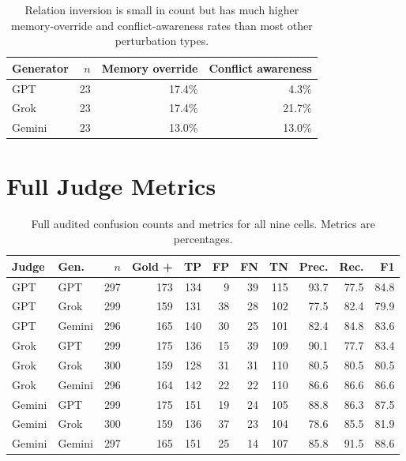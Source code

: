 \documentclass[11pt]{article}
\begin{document}
\begin{table}[h]
\centering
\small
\begin{tabular}{lrrr}
\toprule
\textbf{Generator} & \textbf{$n$} & \textbf{Memory override} & \textbf{Conflict awareness} \\
\midrule
GPT & 23 & 17.4\% & 4.3\% \\
Grok & 23 & 17.4\% & 21.7\% \\
Gemini & 23 & 13.0\% & 13.0\% \\
\bottomrule
\end{tabular}
\caption{Relation inversion is small in count but has much higher memory-override and conflict-awareness rates than most other perturbation types.}
\end{table}

\section{Full Judge Metrics}
\label{app:full_judge}

\begin{table}[h]
\centering
\scriptsize
\begin{tabular}{llrrrrrrrrr}
\toprule
\textbf{Judge} & \textbf{Gen.} & \textbf{$n$} & \textbf{Gold +} & \textbf{TP} & \textbf{FP} & \textbf{FN} & \textbf{TN} & \textbf{Prec.} & \textbf{Rec.} & \textbf{F1} \\
\midrule
GPT & GPT & 297 & 173 & 134 & 9 & 39 & 115 & 93.7 & 77.5 & 84.8 \\
GPT & Grok & 299 & 159 & 131 & 38 & 28 & 102 & 77.5 & 82.4 & 79.9 \\
GPT & Gemini & 296 & 165 & 140 & 30 & 25 & 101 & 82.4 & 84.8 & 83.6 \\
Grok & GPT & 299 & 175 & 136 & 15 & 39 & 109 & 90.1 & 77.7 & 83.4 \\
Grok & Grok & 300 & 159 & 128 & 31 & 31 & 110 & 80.5 & 80.5 & 80.5 \\
Grok & Gemini & 296 & 164 & 142 & 22 & 22 & 110 & 86.6 & 86.6 & 86.6 \\
Gemini & GPT & 299 & 175 & 151 & 19 & 24 & 105 & 88.8 & 86.3 & 87.5 \\
Gemini & Grok & 300 & 159 & 136 & 37 & 23 & 104 & 78.6 & 85.5 & 81.9 \\
Gemini & Gemini & 297 & 165 & 151 & 25 & 14 & 107 & 85.8 & 91.5 & 88.6 \\
\bottomrule
\end{tabular}
\caption{Full audited confusion counts and metrics for all nine cells. Metrics are percentages.}
\end{table}
\end{document}
